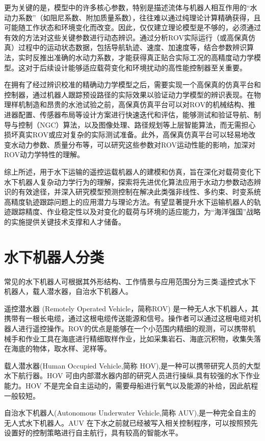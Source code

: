 更为关键的是，模型中的许多核心参数，特别是描述流体与机器人相互作用的“水动力系数”（如阻尼系数、附加质量系数），往往难以通过纯理论计算精确获得，且可能随工作状态和环境变化而改变。因此，仅仅建立理论模型是不够的，必须通过有效的方法对这些关键参数进行动态辨识。通过分析ROV实际运行（或高保真仿真）过程中的运动状态数据，包括导航轨迹、速度、加速度等，结合参数辨识算法，实时反推出准确的水动力系数，才能获得真正贴合实际工况的高精度动力学模型。这对于后续设计能够适应载荷变化和环境扰动的高性能控制器至关重要。

在拥有了经过辨识校准的精确动力学模型之后，需要实现一个高保真的仿真平台和控制器，通过机器人跟踪预设路径的实际效果以验证动力学模型的辨识表现。在物理样机制造和昂贵的水池试验之前，高保真仿真平台可以对ROV的机械结构、推进器配置、传感器布局等设计方案进行快速迭代和评估，能够测试和验证导航、制导与控制（NGC）算法，以及图像处理、路径规划等上层智能算法，而无需担心损坏真实ROV或应对复杂的实际测试准备。此外，高保真仿真平台可以轻易地改变水动力参数、质量分布等，可以研究这些参数对ROV运动性能的影响，加深对ROV动力学特性的理解。

综上所述，用于水下运输的遥控运载机器人的建模和仿真，旨在深化对载荷变化下水下机器人复杂动力学行为的理解，探索将先进优化算法应用于水动力参数动态辨识的有效途径，并深入研究模型预测控制在解决此类强非线性、多约束、时变系统高精度轨迹跟踪问题上的应用潜力与理论方法。有望显著提升水下运输机器人的轨迹跟踪精度、作业稳定性以及对变化的载荷与环境的适应能力，为“海洋强国”战略的实施提供关键技术支撑和人才储备。

\section{水下机器人分类}

常见的水下机器人可根据其外形结构、工作情景与应用范围分为三类:遥控式水下机器人，载人潜水器，自治水下机器人。

遥控潜水器 (Remotely Operated Vehicle，简称ROV) 是一种无人水下机器人，其携带有一根长电缆，通过这根电缆传送能源和信号。操作者可以通过这根电缆对机器人进行遥控操作。ROV的优点是能够在一个小范围内精细的观测，可以携带机械手和作业工具在海底进行精细取样作业，比如采集岩石、海底沉积物，收集失落在海底的物体，取水样、泥样等。

载人潜水器(Human Occupied Vehicle,简称 HOV),是一种可以携带研究人员的大型水下航行器。HOV 可由内部潜水器内部的研究人员进行操纵,具有较强的水下作业能力。HOV 不是完全自主运动的，需要母船进行氧气以及能源的补给，因此航程一般较短。

自治水下机器人(Autonomous Underwater Vehicle,简称 AUV),是一种完全自主的无人式水下机器人。AUV 在下水之前就已经被写入相关控制程序，可以按照预先设置好的控制策略进行自主航行，具有较高的智能水平。

